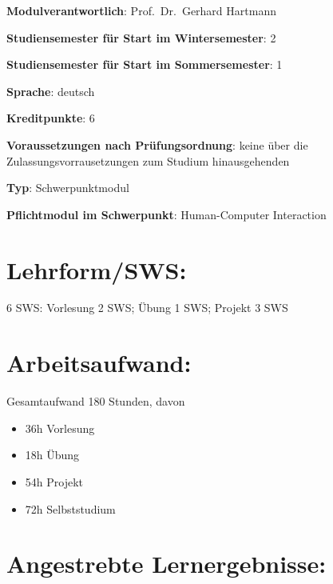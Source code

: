 \begin{modulHead}
\textbf{Modulverantwortlich}: Prof.~Dr.~Gerhard
Hartmann
\end{modulHead}
\begin{modulHead}
\textbf{Studiensemester für
Start im Wintersemester}:
2
\end{modulHead}
\begin{modulHead}
\textbf{Studiensemester für Start
im Sommersemester}:
1
\end{modulHead}
\begin{modulHead}
\textbf{Sprache}:
deutsch
\end{modulHead}
\begin{modulHead}
\textbf{Kreditpunkte}:
6
\end{modulHead}
\begin{modulHead}
\textbf{Voraussetzungen nach
Prüfungsordnung}: keine über die Zulassungsvorrausetzungen zum Studium
hinausgehenden
\end{modulHead}
\begin{modulHead}
\textbf{Typ}:
Schwerpunktmodul
\end{modulHead}
\begin{modulHead}
\textbf{Pflichtmodul
im Schwerpunkt}: Human-Computer Interaction
\end{modulHead}


\section*{Lehrform/SWS:}\label{lehrformsws-6}

6 SWS: Vorlesung 2 SWS; Übung 1 SWS; Projekt 3 SWS

\section*{Arbeitsaufwand:}\label{arbeitsaufwand-7}

Gesamtaufwand 180 Stunden, davon

\begin{itemize}
\tightlist
\item
  36h Vorlesung
\item
  18h Übung
\item
  54h Projekt
\item
  72h Selbststudium
\end{itemize}

\section*{Angestrebte
Lernergebnisse:}\label{angestrebte-lernergebnisse-6}

